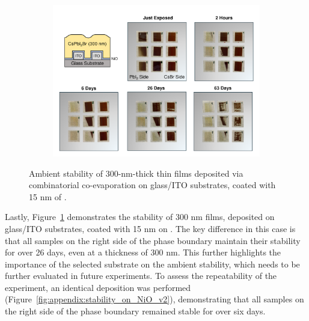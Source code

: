 \begin{figure}[htbp]
    \centering
    \begin{subfigure}[t]{0.99\textwidth}
        \centering
        \includegraphics[width=\textwidth]{chapters/stability/imeges/Stability_No_Rotation_275_on_nio.pdf} %
    \end{subfigure}

    \caption{Ambient stability of 300-nm-thick  thin films deposited via combinatorial co-evaporation on glass/ITO substrates, coated with 15 nm of .}
    \label{fig:stability:no_rotation:300nm_ito_nio}
\end{figure}


Lastly, Figure~\ref{fig:stability:no_rotation:300nm_ito_nio} demonstrates the stability of 300 nm  films, deposited on glass/ITO substrates, coated with 15 nm on . The key difference in this case is that all samples on the right side of the phase boundary maintain their stability for over 26 days, even at a thickness of 300 nm. This further highlights the importance of the selected substrate on the ambient stability, which needs to be further evaluated in future experiments. To assess the repeatability of the experiment, an identical deposition was performed (Figure~\ref{fig:appendix:stability_on_NiO_v2}), demonstrating that all samples on the right side of the phase boundary remained stable for over six days. 

